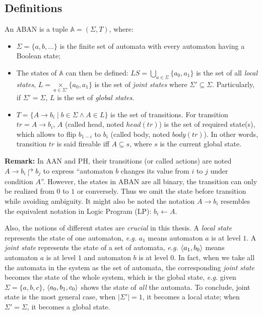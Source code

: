 \subsection{Definitions}
\begin{definition}[ABAN]\label{def:ABAN}
An ABAN is a tuple $\mathbb{A} = (\Sigma,T)$, where:
\begin{itemize}
\item $\Sigma=\{a,b,\ldots\}$ is the finite set of automata with every automaton having a Boolean state;
\item The states of $\mathbb{A}$ can then be defined: $LS= \underset{a\in \Sigma}{\bigcup} \{a_0,a_1\}$ is the set of all \textit{local states}, $L= \underset{a\in \Sigma'}{\times} \{a_0,a_1\}$ is the set of \textit{joint states} where $\Sigma'\subseteq\Sigma$. Particularly, if $\Sigma'=\Sigma$, $L$ is the set of \textit{global states}. 
\item $T= \{A\rightarrow b_i\mid b\in \Sigma \land A\in L\}$ is the set of transitions.
For transition $tr=A\to b_i$, $A$ (called head, noted $head(tr)$) is the set of required state(s), which allows to flip $b_{1-i}$ to $b_i$ (called body, noted $body(tr)$). In other words, transition $tr$ is said fireable iff $A\subseteq s$, where $s$ is the current global state. 
\end{itemize}
\end{definition}

\textbf{Remark:} In AAN and PH, their transitions (or called actions) are noted $A\rightarrow b_i\Rsh b_j$ to express ``automaton $b$ changes its value from $i$ to $j$ under condition $A$''.
However, the states in ABAN are all binary, the transition can only be realized from $0$ to $1$ or conversely.
Thus we omit the state before transition while avoiding ambiguity.
It might also be noted the notation $A\rightarrow b_i$ resembles the equivalent notation in Logic Program (LP): $b_i \leftarrow A$.

Also, the notions of different states are \textit{crucial} in this thesis.
A \textit{local state} represents the state of one automaton, \textit{e.g.} $a_1$ means automaton $a$ is at level $1$.
A \textit{joint state} represents the state of a set of automata, \textit{e.g.} $\langle a_1, b_0\rangle$ means automaton $a$ is at level $1$ and automaton $b$ is at level $0$.
In fact, when we take all the automata in the system as the set of automata, the corresponding \textit{joint state} becomes the state of the whole system, which is the global state, \textit{e.g.} given $\Sigma =\{a,b,c\}$, $\langle a_0, b_1,c_0 \rangle$ shows the state of \textit{all} the automata.
To conclude, joint state is the most general case, when $|\Sigma'|=1$, it becomes a local state;
when $\Sigma'=\Sigma$, it becomes a global state.

